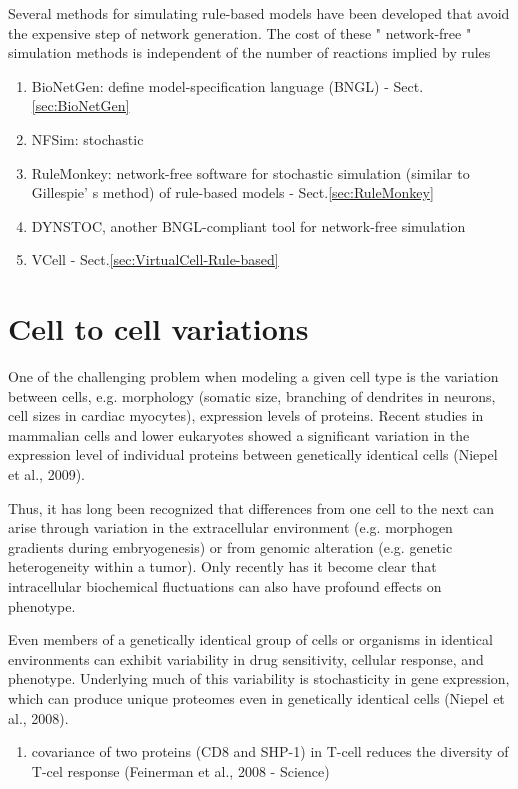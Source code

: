 Several methods for simulating rule-based models have been developed that avoid
the expensive step of network generation. The cost of these " network-free "
simulation methods is independent of the number of reactions implied by rules


\begin{enumerate}
  \item BioNetGen: define model-specification language (BNGL) -
  Sect.\ref{sec:BioNetGen}
  
  \item NFSim: stochastic 
  
  \item RuleMonkey: network-free software for stochastic simulation (similar to
  Gillespie' s method) of
  rule-based models - Sect.\ref{sec:RuleMonkey}
  
  \item DYNSTOC, another BNGL-compliant tool for network-free simulation
  
  \item VCell - Sect.\ref{sec:VirtualCell-Rule-based}
\end{enumerate}


\section{Cell to cell variations}


One of the challenging problem when modeling a given cell type is the variation
between cells, e.g. morphology (somatic size, branching of dendrites in
neurons, cell sizes in cardiac myocytes), expression levels of proteins. 
Recent studies in mammalian cells and lower eukaryotes
showed a significant variation in the expression level of individual
proteins between genetically identical cells (Niepel et al., 2009).

Thus, it has long been recognized that differences from one cell to the next can
arise through variation in the extracellular environment (e.g. morphogen
gradients during embryogenesis) or from genomic alteration (e.g. genetic
heterogeneity within a tumor). Only recently has it become clear that
intracellular biochemical fluctuations can also have profound effects on
phenotype.

Even members of a genetically identical group of cells or organisms in identical
environments can exhibit variability in drug sensitivity, cellular response, and
phenotype. Underlying much of this variability is stochasticity in gene
expression, which can produce unique proteomes even in genetically identical
cells (Niepel et al., 2008).
\begin{enumerate}
  \item covariance of two proteins (CD8 and SHP-1)  in T-cell reduces the
  diversity of T-cel response (Feinerman et al., 2008 - Science)
\end{enumerate}


